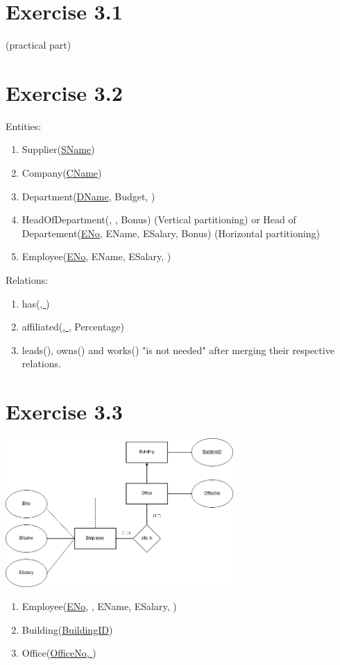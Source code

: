 \documentclass{article} %
\newcommand{\homeworkNumber}{3}
\begin{document}
\section*{Exercise \homeworkNumber.1}

(practical part)

\section*{Exercise \homeworkNumber.2}

\noindent
Entities:
\begin{enumerate}[-]
\item Supplier(\underline{SName})
\item Company(\underline{CName})
\item Department(\underline{DName},  Budget, )
\item HeadOfDepartment(\underline{}, , Bonus) (Vertical partitioning) or Head of Departement(\underline{ENo}, EName, ESalary, Bonus) (Horizontal partitioning)
\item Employee(\underline{ENo}, EName, ESalary, )
\end{enumerate}

\noindent
Relations:
\begin{enumerate}[-]
\item has(\underline{, })
\item affiliated(\underline{, }, Percentage)
\item leads(), owns() and works() "is not needed" after merging their respective relations.

\end{enumerate}

\section*{Exercise \homeworkNumber.3}

\begin{center}
\includegraphics[width=0.65\textwidth]{sheet_3_ex_3.drawio.png}
\end{center}
\begin{enumerate}[-]
\item Employee(\underline{ENo}, , EName, ESalary, )

\item Building(\underline{BuildingID})
\item Office(\underline{OfficeNo, })
\end{enumerate}
\end{document}
